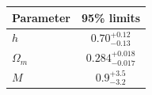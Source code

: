 \begin{tabular} { l  c}

 Parameter &  95\% limits\\
\hline
{\boldmath$h              $} & $0.70^{+0.12}_{-0.13}      $\\

{\boldmath$Ω_m            $} & $0.284^{+0.018}_{-0.017}   $\\

{\boldmath$M              $} & $0.9^{+3.5}_{-3.2}         $\\
\hline
\end{tabular}